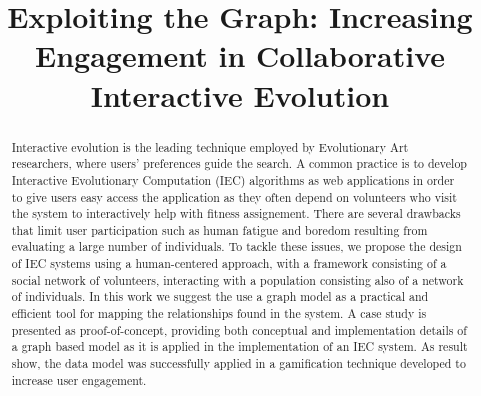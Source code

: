 \documentclass[conference]{IEEEtran}
\begin{document}

\title{Exploiting the Graph: Increasing Engagement in Collaborative Interactive Evolution}



\author{
\and
{}
\and
{}
}

\maketitle

\begin{abstract}
Interactive evolution is the leading technique employed by 
Evolutionary Art researchers, where users' preferences guide the search. A common
practice is to develop Interactive Evolutionary Computation (IEC) algorithms
as web applications in order to give users easy access the application as they
often depend on volunteers who visit the system to interactively help with fitness assignement. 
There are several drawbacks that limit user participation 
such as human fatigue and boredom resulting from evaluating 
a large number of individuals. 
To tackle these issues, we propose the design of IEC systems using a human-centered 
approach, with a framework consisting of a social network of 
volunteers, interacting with a population consisting also of a network 
of individuals. In this work we suggest the use a graph model as a practical 
and efficient tool for mapping the relationships 
found in the system. A case study is presented as proof-of-concept, 
providing both conceptual and implementation details of a graph based model 
as it is  applied in the implementation of an IEC system. 
As result show, the data model was successfully applied in a gamification technique 
developed to increase user engagement. 




\end{abstract}
\end{document}

